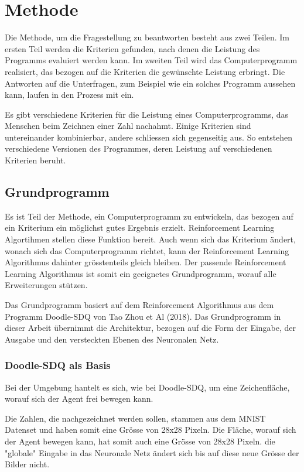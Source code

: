 \chapter{Methode}
Die Methode, um die Fragestellung zu beantworten besteht aus zwei Teilen. Im
ersten Teil werden die Kriterien gefunden, nach denen die Leistung des Programms
evaluiert werden kann. Im zweiten Teil wird das Computerprogramm realisiert, das
bezogen auf die Kriterien die gewünschte Leistung erbringt. Die Antworten auf die
Unterfragen, zum Beispiel wie ein solches Programm aussehen kann, laufen in den
Prozess mit ein. 

Es gibt verschiedene Kriterien für die Leistung eines Computerprogramms, das
Menschen beim Zeichnen einer Zahl nachahmt. Einige Kriterien sind untereinander
kombinierbar, andere schliessen sich gegenseitig aus. So entstehen verschiedene
Versionen des Programmes, deren Leistung auf verschiedenen Kriterien beruht.


\section{Grundprogramm}
Es ist Teil der Methode, ein Computerprogramm zu entwickeln, das bezogen auf ein
Kriterium ein möglichst gutes Ergebnis erzielt. Reinforcement Learning
Algortihmen stellen diese Funktion bereit. Auch wenn sich das Kriterium ändert,
wonach sich das Computerprogramm richtet, kann der Reinforcement Learning
Algorithmus dahinter grösstenteils gleich bleiben. Der passende Reinforcement
Learning Algorithmus ist somit ein geeignetes Grundprogramm, worauf alle
Erweiterungen stützen.

Das Grundprogramm basiert auf dem Reinforcement Algorithmus aus dem Programm
Doodle-SDQ von Tao Zhou et Al (2018). Das Grundprogramm in dieser Arbeit
übernimmt die Architektur, bezogen auf die Form der Eingabe, der Ausgabe und den
versteckten Ebenen des Neuronalen Netz. 

\subsection*{Doodle-SDQ als Basis}
Bei der Umgebung hantelt es sich, wie bei Doodle-SDQ, um eine Zeichenfläche,
worauf sich der Agent frei bewegen kann. 

Die Zahlen, die nachgezeichnet werden sollen, stammen aus dem MNIST Datenset und
haben somit eine Grösse von 28x28 Pixeln. Die Fläche, worauf sich der Agent
bewegen kann, hat somit auch eine Grösse von 28x28 Pixeln. die "globale" Eingabe
in das Neuronale Netz ändert sich bis auf diese neue Grösse der Bilder nicht.

